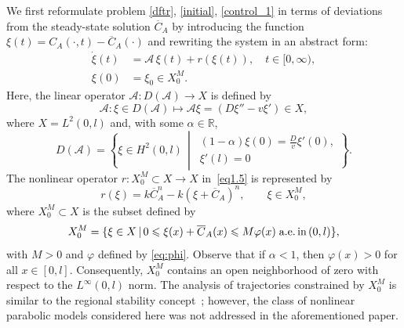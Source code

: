 \documentclass{mpi2015-cscpreprint}
\numberwithin{equation}{section}
\begin{document}
{ We first reformulate problem \eqref{dftr}, \eqref{initial}, \eqref{control_1} in terms of deviations from the steady-state solution $\overline{C}_A$ by introducing the function $\xi(t)= C_A(\cdot,t)-\overline{C}_A(\cdot)$ and rewriting the system in an abstract form:}
%
\begin{equation}\label{eq1.5}
\begin{aligned}
 \dot{{\xi}}(t)&=\mathcal{A}\,{\xi}(t)+r({\xi}(t)),\quad t\in[0,\infty),
 \\\xi(0)&=\xi_0\in X_0^M.   
\end{aligned}
\end{equation}
Here, the linear operator $\mathcal{A}:D(\mathcal{A})\to X$ is defined by
\begin{equation}\label{opA}
    \mathcal{A}:{\xi}\in D(\mathcal{A}) \mapsto \mathcal{A}{\xi} =
            (D\xi'' -v\xi')\in X,
\end{equation}
where $X=L^2(0,l)$ and, with some $\alpha\in\mathbb{R}$,
\begin{equation*}
D(\mathcal{A})=
\left\{\xi\in H^2(0,l)\,\middle|\,
\begin{array}{l}
(1-\alpha)\xi(0)=\frac{D}{v}\xi'(0),\\
\xi'(l)=0
\end{array}
\right\}.
\end{equation*}
The nonlinear operator $r:X_0^M\subset X\to X$ in~\eqref{eq1.5} is represented by 
\begin{equation}\label{eq3.6}
    r({\xi})=k\overline{C}_A^n-k (\xi+\overline{C}_A)^n, \qquad\xi\in X_0^M,
\end{equation}
where $X_0^M\subset X$ is the subset defined by
\begin{equation}\label{eq:X_0}
X_0^M = \{\xi\in X \,|\, 0\leqslant\xi(x)+\overline{C}_A(x)\leqslant M \varphi(x)\;\text{a.e.\,in}\,(0,l)\},
\end{equation}
with $M>0$ and $\varphi$ defined by \eqref{eq:phi}.
Observe that if $\alpha<1$, then $\varphi(x)>0$ for all $x\in[0,l]$. Consequently, $X_0^M$ contains an open neighborhood of zero with respect to the $L^\infty(0,l)$ norm. The analysis of trajectories constrained by $X_0^M$ is similar to the regional stability concept~\cite{zerrik2003regional}; however, the class of nonlinear parabolic models considered here was not addressed in the aforementioned paper.
\end{document}

